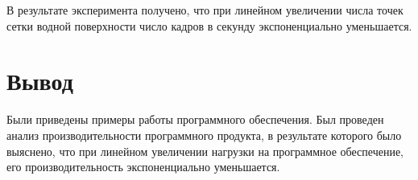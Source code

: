 В результате эксперимента получено, что при линейном увеличении числа точек сетки водной поверхности число кадров в секунду экспоненциально уменьшается. 

\section*{Вывод}

Были приведены примеры работы программного обеспечения. Был проведен анализ производительности программного продукта, в результате которого было выяснено, что при линейном увеличении нагрузки на программное обеспечение, его производительность экспоненциально уменьшается.